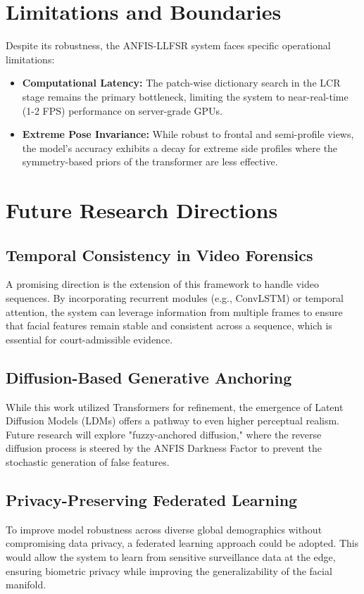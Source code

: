 \section{Limitations and Boundaries}
Despite its robustness, the ANFIS-LLFSR system faces specific operational limitations:
\begin{itemize}
    \item \textbf{Computational Latency:} The patch-wise dictionary search in the LCR stage remains the primary bottleneck, limiting the system to near-real-time (1-2 FPS) performance on server-grade GPUs.
    \item \textbf{Extreme Pose Invariance:} While robust to frontal and semi-profile views, the model's accuracy exhibits a decay for extreme side profiles where the symmetry-based priors of the transformer are less effective.
\end{itemize}

\section{Future Research Directions}
\subsection{Temporal Consistency in Video Forensics}
A promising direction is the extension of this framework to handle video sequences. By incorporating recurrent modules (e.g., ConvLSTM) or temporal attention, the system can leverage information from multiple frames to ensure that facial features remain stable and consistent across a sequence, which is essential for court-admissible evidence.

\subsection{Diffusion-Based Generative Anchoring}
While this work utilized Transformers for refinement, the emergence of Latent Diffusion Models (LDMs) offers a pathway to even higher perceptual realism. Future research will explore "fuzzy-anchored diffusion," where the reverse diffusion process is steered by the ANFIS Darkness Factor to prevent the stochastic generation of false features.

\subsection{Privacy-Preserving Federated Learning}
To improve model robustness across diverse global demographics without compromising data privacy, a federated learning approach could be adopted. This would allow the system to learn from sensitive surveillance data at the edge, ensuring biometric privacy while improving the generalizability of the facial manifold.

